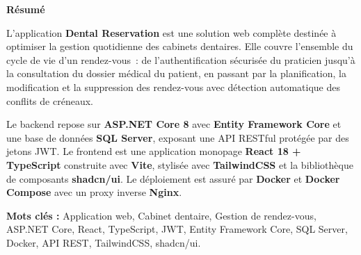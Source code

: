\clearpage
\thispagestyle{chaptertitlepage}

\vspace*{2cm}

\begin{center}
{\fontsize{24}{29}\selectfont\bfseries Résumé}
\end{center}

\vspace{1.5cm}

{\fontsize{14}{18}\selectfont
L'application \textbf{Dental Reservation} est une solution web complète destinée à optimiser la gestion quotidienne des cabinets dentaires. Elle couvre l'ensemble du cycle de vie d'un rendez-vous~: de l'authentification sécurisée du praticien jusqu'à la consultation du dossier médical du patient, en passant par la planification, la modification et la suppression des rendez-vous avec détection automatique des conflits de créneaux.

Le backend repose sur \textbf{ASP.NET Core 8} avec \textbf{Entity Framework Core} et une base de données \textbf{SQL Server}, exposant une API RESTful protégée par des jetons JWT. Le frontend est une application monopage \textbf{React 18 + TypeScript} construite avec \textbf{Vite}, stylisée avec \textbf{TailwindCSS} et la bibliothèque de composants \textbf{shadcn/ui}. Le déploiement est assuré par \textbf{Docker} et \textbf{Docker Compose} avec un proxy inverse \textbf{Nginx}.
}

\vspace{1.5cm}

{\fontsize{14}{18}\selectfont
\textbf{Mots clés :} Application web, Cabinet dentaire, Gestion de rendez-vous, ASP.NET Core, React, TypeScript, JWT, Entity Framework Core, SQL Server, Docker, API REST, TailwindCSS, shadcn/ui.
}

\clearpage
